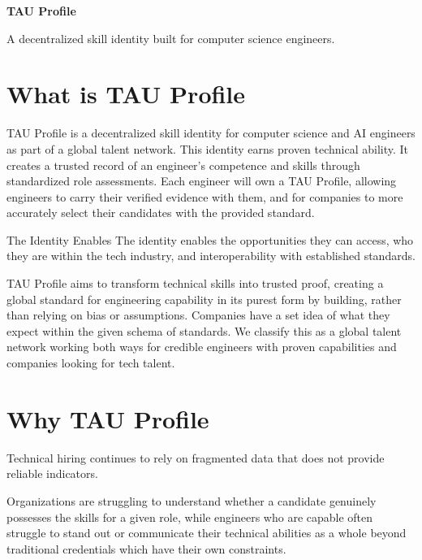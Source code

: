 \documentclass[11pt,letterpaper]{article}
\begin{document}
\begin{titlepage}
  \centering
  \vspace*{1.1in}
  {\Huge\bfseries\color{TauNavy} TAU Profile\par}
  \vspace{0.35in}
  {\Large A decentralized skill identity built for computer science engineers.\par}
  \vfill
\end{titlepage}

\section{What is TAU Profile}

TAU Profile is a decentralized skill identity for computer science and AI engineers as part of a global talent network. This identity earns proven technical ability. It creates a trusted record of an engineer's competence and skills through standardized role assessments. Each engineer will own a TAU Profile, allowing engineers to carry their verified evidence with them, and for companies to more accurately select their candidates with the provided standard.

\begin{insightbox}{The Identity Enables}
The identity enables the opportunities they can access, who they are within the tech industry, and interoperability with established standards.
\end{insightbox}

TAU Profile aims to transform technical skills into trusted proof, creating a global standard for engineering capability in its purest form by building, rather than relying on bias or assumptions. Companies have a set idea of what they expect within the given schema of standards. We classify this as a global talent network working both ways for credible engineers with proven capabilities and companies looking for tech talent.

\section{Why TAU Profile}

Technical hiring continues to rely on fragmented data that does not provide reliable indicators.

Organizations are struggling to understand whether a candidate genuinely possesses the skills for a given role, while engineers who are capable often struggle to stand out or communicate their technical abilities as a whole beyond traditional credentials which have their own constraints.
\end{document}
